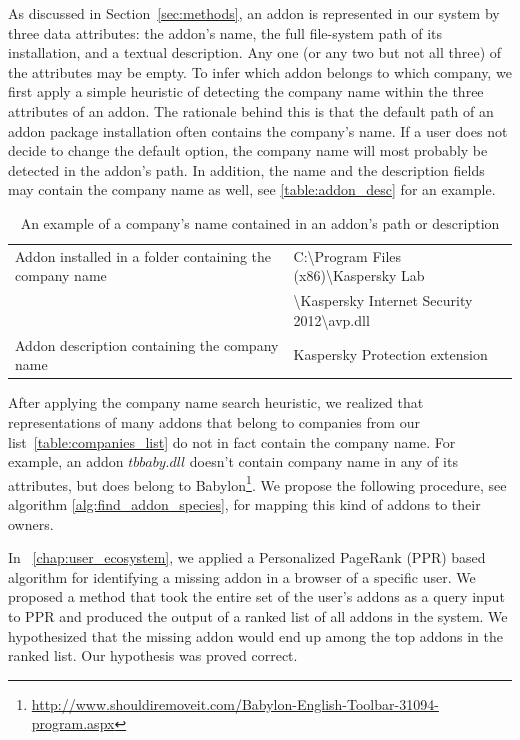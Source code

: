 \documentclass[11pt,oneside]{book}
\begin{document}
As discussed in Section~\ref{sec:methods}, an addon is represented in our system by three data attributes: the addon's name, the full file-system path of its installation, and a textual description. Any one (or any two but not all three) of the attributes may be empty. To infer which addon belongs to which company, we first apply a simple heuristic of detecting the company name within the three attributes of an addon. The rationale behind this is that the default path of an addon package installation often contains the company's name. If a user does not decide to change the default option, the company name will most probably be detected in the addon's path. In addition, the name and the description fields may contain the company name as well, see \autoref{table:addon_desc} for an example.

\begin{table}[!htbp]
\centering
\caption{An example of a company's name contained in an addon's path or description}
\label{table:addon_desc}
\begin{tabular}{@{}|l|l|@{}}
\toprule
Addon installed in a folder containing the company name & C:\textbackslash{Program Files (x86)}\textbackslash{Kaspersky Lab}\\ & \textbackslash{Kaspersky Internet Security 2012}\textbackslash{avp.dll} \\ \midrule
Addon description containing the company name & Kaspersky Protection extension \\ \bottomrule
\end{tabular}
\end{table}

After applying the company name search heuristic, we realized that representations of many addons that belong to companies from our list~\autoref{table:companies_list} do not in fact contain the company name. For example, an addon $tbbaby.dll$ doesn't contain company name in any of its attributes, but does belong to Babylon\footnote{\url{http://www.shouldiremoveit.com/Babylon-English-Toolbar-31094-program.aspx}}. 
We propose the following procedure, see algorithm \autoref{alg:find_addon_species}, for mapping this kind of addons to their owners. 

In ~\autoref{chap:user_ecosystem}, we applied a Personalized PageRank (PPR) based algorithm for identifying a missing addon in a browser of a specific user. We proposed a method that took the entire set of the user's addons as a query input to PPR and produced the output of a ranked list of all addons in the system. We hypothesized that the missing addon would end up among the top addons in the ranked list. Our hypothesis was proved correct.
\end{document}
